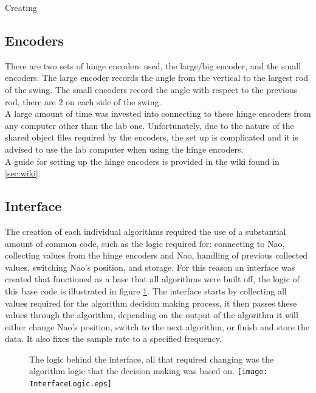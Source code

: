 \documentclass[11pt]{article}
\newcommand*\ruleline[1]{\par\noindent\raisebox{.8ex}{\makebox[\linewidth]{\hrulefill\hspace{1ex}\raisebox{-.8ex}{#1}\hspace{1ex}\hrulefill}}}
\begin{document}
Creating 

\subsection{Encoders}
\ruleline{George Sheppard}
There are two sets of hinge encoders used, the large/big encoder, and the small encoders. The large encoder records the angle from the vertical to the largest rod of the swing. The small encoders record the angle with respect to the previous rod, there are 2 on each side of the swing.\\

A large amount of time was invested into connecting to these hinge encoders from any computer other than the lab one. Unfortunately, due to the nature of the shared object files required by the encoders, the set up is complicated and it is advised to use the lab computer when using the hinge encoders.\\

A guide for setting up the hinge encoders is provided in the wiki found in \ref{sec:wiki}.

\subsection{Interface}\label{Interface}
The creation of each individual algorithms required the use of a substantial amount of common code, such as the logic required for: connecting to Nao, collecting values from the hinge encoders and Nao, handling of previous collected values, switching Nao's position, and storage. For this reason an interface was created that functioned as a base that all algorithms were built off, the logic of this base code is illustrated in figure \ref{InterfaceLogic}. The interface starts by collecting all values required for the algorithm decision making process, it then passes these values through the algorithm, depending on the output of the algorithm it will either change Nao's position, switch to the next algorithm, or finish and store the data. It also fixes the sample rate to a specified frequency.\\

    \begin{figure}[!htb]
        \centering
        \captionbox
             {The logic behind the interface, all that required changing was the algorithm logic that the decision making was based on.\label{InterfaceLogic}}
             {\texttt{[image: InterfaceLogic.eps]}}
    \end{figure}
\end{document}
